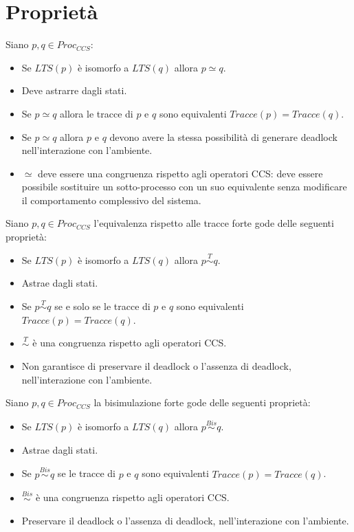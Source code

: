 \section{Proprietà}
Siano $p, q \in Proc_{CCS}$:
\begin{itemize}
    \item Se $LTS(p)$ è isomorfo a $LTS(q)$ allora $p \simeq q$.
    \item Deve astrarre dagli stati.
    \item Se $p \simeq q$ allora le tracce di $p$ e $q$ sono equivalenti
          $Tracce(p) = Tracce(q)$.
    \item Se $p \simeq q$ allora $p$ e $q$ devono avere la stessa possibilità di
          generare deadlock nell'interazione con l'ambiente.
    \item $\simeq$ deve essere una congruenza rispetto agli operatori CCS: deve
          essere possibile sostituire un sotto-processo con un suo equivalente senza
          modificare il comportamento complessivo del sistema.
\end{itemize}
Siano $p, q \in Proc_{CCS}$ l'equivalenza rispetto alle tracce forte gode delle
seguenti proprietà:
\begin{itemize}
    \item Se $LTS(p)$ è isomorfo a $LTS(q)$ allora $p \stackrel{T}{\sim} q$.
    \item Astrae dagli stati.
    \item Se $p \stackrel{T}{\sim} q$ se e solo se le tracce di $p$ e $q$ sono
          equivalenti $Tracce(p) = Tracce(q)$.
    \item $\stackrel{T}{\sim}$ è una congruenza rispetto agli operatori CCS.
    \item Non garantisce di preservare il deadlock o l'assenza di deadlock,
          nell'interazione con l'ambiente.
\end{itemize}
Siano $p, q \in Proc_{CCS}$ la bisimulazione forte gode delle seguenti proprietà:
\begin{itemize}
    \item Se $LTS(p)$ è isomorfo a $LTS(q)$ allora $p \stackrel{Bis}{\sim} q$.
    \item Astrae dagli stati.
    \item Se $p \stackrel{Bis}{\sim} q$ se le tracce di $p$ e $q$ sono equivalenti
          $Tracce(p) = Tracce(q)$.
    \item $\stackrel{Bis}{\sim}$ è una congruenza rispetto agli operatori CCS.
    \item Preservare il deadlock o l'assenza di deadlock, nell'interazione con
          l'ambiente.
\end{itemize}
